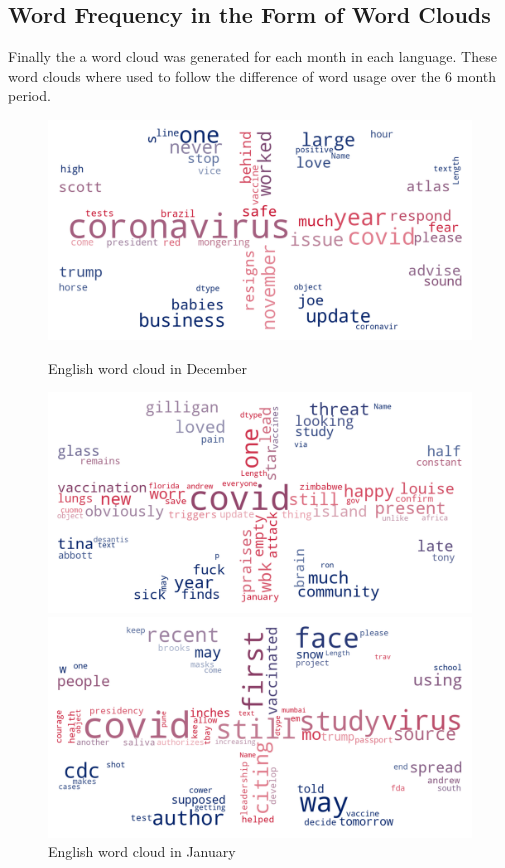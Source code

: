 \begin{landscape}
\newpage

\section{Word Frequency in the Form of Word Clouds}

Finally the a word cloud was generated for each month in each language.
These word clouds where used to follow the difference of word usage over the 6 month period.


\begin{figure}[!htb]
  \includegraphics[width=\linewidth]{December en word cloud.png}
  \caption{English word cloud in December}\label{fig:decemberUK}
\endminipage\hfill
{}
  \includegraphics[width=\linewidth]{January en word cloud.png}
  \caption{English word cloud in January}\label{fig:januaryUK}
\endminipage\hfill
{}
  \includegraphics[width=\linewidth]{February en word cloud.png}

\end{figure}
\end{landscape}
